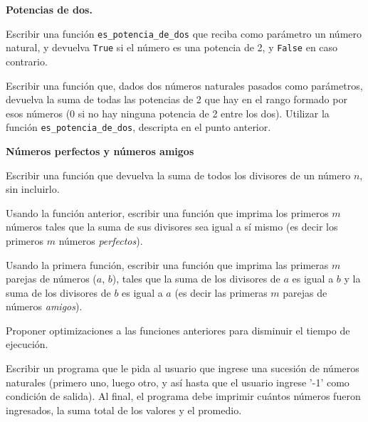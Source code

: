 \begin{ejercicio}
{\bf Potencias de dos.}
\begin{partes}
    \item Escribir una función \verb!es_potencia_de_dos! que reciba como parámetro
un número natural, y devuelva \verb!True! si el número es una potencia de 2,
y \verb!False! en caso contrario.
    \item Escribir una función que, dados dos números naturales pasados como
parámetros, devuelva la suma de todas las potencias de 2 que hay en el
rango formado por esos números (0 si no hay ninguna potencia de 2 entre los
dos). Utilizar la función \verb!es_potencia_de_dos!, descripta en el
punto anterior.
\end{partes}
\end{ejercicio}


\begin{ejercicio}
{\bf Números perfectos y números amigos}
\begin{partes}
    \item Escribir una función que devuelva la suma de todos los divisores de
un número $n$, sin incluirlo.
    \item Usando la función anterior, escribir una función que imprima los
primeros $m$ números tales que la suma de sus divisores sea igual a sí
mismo (es decir los primeros $m$ números \emph{perfectos}).
    \item Usando la primera función, escribir una función que imprima las
primeras $m$ parejas de números ($a$, $b$), tales que la suma de los
divisores de $a$ es igual a $b$ y la suma de los divisores de $b$ es igual
a $a$ (es decir las primeras $m$ parejas de números \emph{amigos}).
    \item Proponer optimizaciones a las funciones anteriores para disminuir el
tiempo de ejecución.
\end{partes}
\end{ejercicio}

\begin{ejercicio}
Escribir un programa que le pida al usuario que ingrese una sucesión
de números naturales (primero uno, luego otro, y así hasta que el
usuario ingrese '-1' como condición de salida). Al final, el programa
debe imprimir cuántos números fueron ingresados, la suma total de los
valores y el promedio.
\end{ejercicio}

